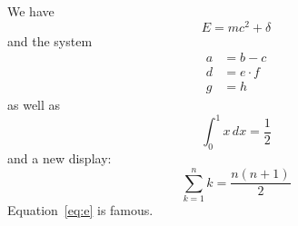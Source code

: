 \documentclass{article}
\begin{document}
We have
\begin{equation}
  E = m c^2 + \delta \label{eq:e}
\end{equation}
and the system
\begin{align}
  a &= b - c \\
  d &= e \cdot f \label{eq:d} \\
  g &= h
\end{align}
as well as
\[ \int_0^1 x\,dx = \frac{1}{2} \]
and a new display:
$$ \sum_{k=1}^n k = \frac{n(n+1)}{2} $$
Equation~\eqref{eq:e} is famous.
\end{document}
